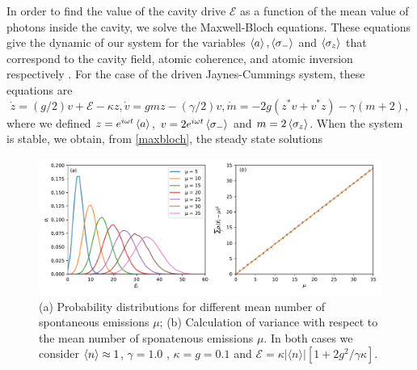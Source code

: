 \documentclass[%
 reprint,
 amsmath,amssymb,
 aps, 
]{revtex4-2}
\begin{document}
In order to find the value of the cavity drive $\mathcal{E}$ as a
function of the mean value of photons inside the cavity, we solve the
Maxwell-Bloch equations. These equations give the dynamic of our
system for the variables $\expval{a}, \expval{\sigma_-}$ and
$\expval{\sigma_z}$ that correspond to the cavity field, atomic
coherence, and atomic inversion respectively \cite{Alsing_1991}. For
the case of the driven Jaynes-Cummings system, these equations are
\begin{subequations} \label{maxbloch}
\begin{equation} \label{bloch1}
\dot{z} = (g/2)v + \mathcal{E} - \kappa z,
\end{equation}
\begin{equation} \label{bloch2}
\dot{v} = gmz - (\gamma/2)v,
\end{equation}
\begin{equation} \label{bloch3}
\dot{m} = -2g(z^*v + v^*z) - \gamma(m + 2),
\end{equation}
\end{subequations} 
where we defined $z = e^{i\omega t}\expval{a}$,
$v = 2e^{i\omega t}\expval{\sigma_-}$ and $m = 2\expval{\sigma_z}$.
When the system is stable, we obtain, from
\eqref{maxbloch}, the steady state
solutions \cite{gagniuc2017markov}
\begin{center}
\begin{figure}[!t]\label{error2}
\begin{center}
\includegraphics[scale = 0.7]{newerrorppp.pdf}
\caption{\small{(a) Probability distributions for different mean number of spontaneous emissions $\mu$; (b) Calculation of variance with respect to the mean number of sponatenous emissions $\mu$. In both cases we consider $\expval{n} \approx 1$, $\gamma = 1.0$ , $\kappa = g = 0.1$ and $\mathcal{E} =  \kappa |\langle n \rangle|[1 + 2g^2/\gamma \kappa]$.}} \label{probdisult}
\end{center}
\end{figure}
\end{center}
\end{document}
